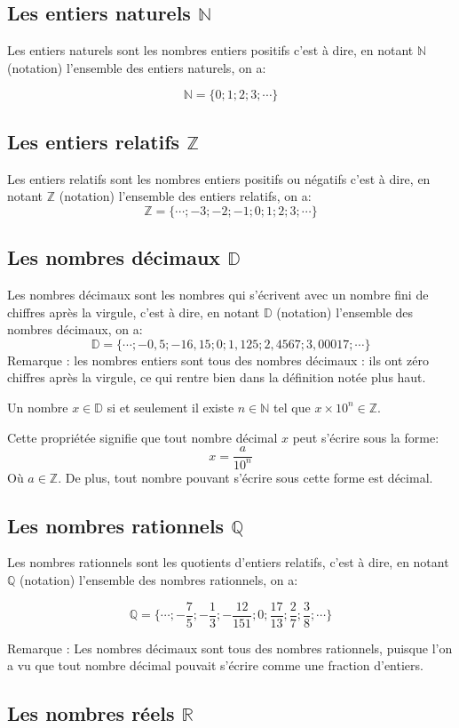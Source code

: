 \documentclass[10pt,a4paper]{book}
\newcommand{\N}{\mathbb{N}}
\newcommand{\Z}{\mathbb{Z}}
\newcommand{\D}{\mathbb{D}}
\newcommand{\Q}{\mathbb{Q}}
\newcommand{\R}{\mathbb{R}}
\begin{document}
\subsection{Les entiers naturels $\N$}
Les entiers naturels sont les nombres entiers positifs c'est à dire, en notant $\N$ 
(notation) l'ensemble des entiers naturels, on a:

$$\N=\{0;1;2;3;\cdots\}$$
\subsection{Les entiers relatifs $\Z$}
Les entiers relatifs sont les nombres entiers positifs ou négatifs c'est à dire, en notant $\Z$ 
(notation) l'ensemble des entiers relatifs, on a:
$$\Z=\{\cdots;-3;-2;-1;0;1;2;3;\cdots\}$$

\subsection{Les nombres décimaux $\D$}
Les nombres décimaux sont les nombres qui s'écrivent avec un nombre fini de chiffres après la virgule,
 c'est à dire, en notant $\D$ 
(notation) l'ensemble des nombres décimaux, on a:
$$\D=\{\cdots;-0{,}5;-16{,}15;0;1{,}125;2{,}4567;3{,}00017;\cdots\}$$
Remarque : les nombres entiers sont tous des nombres décimaux : ils ont zéro chiffres après la virgule, ce qui rentre bien dans la définition notée plus haut.
\begin{prop}
  Un nombre $x\in\D$ si et seulement il existe $n\in\N$ tel que $x\times 10^{n}\in\Z$.
\end{prop}
Cette propriétée signifie que tout nombre décimal $x$ peut s'écrire sous la forme: 
$$x=\frac{a}{10^{n}}$$
Où $a\in\Z$. De plus, tout nombre pouvant s'écrire sous cette forme est décimal.

\subsection{Les nombres rationnels $\Q$}
Les nombres rationnels sont les quotients d'entiers relatifs, c'est à dire, en notant $\Q$ 
(notation) l'ensemble des nombres rationnels, on a:


$$\Q=\{\cdots;-\frac{7}{5};-\frac{1}{3};-\frac{12}{151};0;\frac{17}{13};\frac{2}{7};\frac{3}{8};\cdots\}$$

Remarque : Les nombres décimaux sont tous des nombres rationnels, puisque l'on a vu que tout nombre décimal pouvait s'écrire comme une fraction d'entiers.

\subsection{Les nombres réels $\R$}
\end{document}
